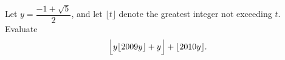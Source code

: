 Let $y=\dfrac{-1+\sqrt5}{2}$, and let $\lfloor t\rfloor$ denote the greatest integer not exceeding $t$. Evaluate
\[
\Bigl\lfloor y\lfloor2009y\rfloor+y\Bigr\rfloor+\lfloor2010y\rfloor .
\]
